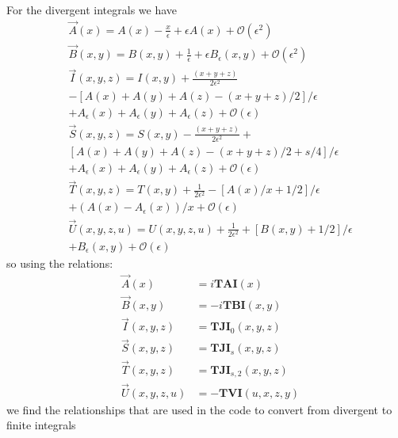 For the divergent integrals we have \cite{Martin2006}
\begin{align*}
&\vec{A}(x) = A(x) -\frac{x}{\epsilon} +\epsilon A(x) +\mathcal{O}(\epsilon^2) \\
&\vec{B}(x,y)= B(x,y) +\frac{1}{\epsilon} +\epsilon B_{\epsilon}(x,y) +\mathcal{O}(\epsilon^2) \\
&\vec{I}(x,y,z)= I(x,y) +\frac{(x+y+z)}{2\epsilon^2}  \\ &- \left[A(x)+A(y)+A(z)-(x+y+z)/2\right]/\epsilon\\ &+ A_{\epsilon}(x)+ A_{\epsilon}(y)+ A_{\epsilon}(z)+\mathcal{O}(\epsilon) \\
&\vec{S}(x,y,z)= S(x,y) -\frac{(x+y+z)}{2\epsilon^2} + \\ & \left[A(x)+A(y)+A(z)-(x+y+z)/2+s/4\right]/\epsilon\\ &+ A_{\epsilon}(x)+ A_{\epsilon}(y)+ A_{\epsilon}(z)+\mathcal{O}(\epsilon) \\
&\vec{T}(x,y,z)= T(x,y) +\frac{1}{2\epsilon^2} -\left[A(x)/x +1/2\right]/\epsilon\\ &+ (A(x)- A_{\epsilon}(x))/x+\mathcal{O}(\epsilon) \\
&\vec{U}(x,y,z,u)= U(x,y,z,u) +\frac{1}{2\epsilon^2} +\left[B(x,y) +1/2\right]/\epsilon\\ &+ B_{\epsilon}(x,y)+\mathcal{O}(\epsilon)
\end{align*}
so using the relations:
\begin{eqnarray*}
&\vec{A}(x) &=i \mathtt{\mathbf{TAI}}(x)\\
&\vec{B}(x,y) &=-i \mathtt{\mathbf{TBI}}(x,y)\\
&\vec{I}(x,y,z)&=\mathtt{\mathbf{TJI}}_0(x,y,z)\\
&\vec{S}(x,y,z)&=\mathtt{\mathbf{TJI}}_s(x,y,z)\\
&\vec{T}(x,y,z)&=\mathtt{\mathbf{TJI}}_{s,2}(x,y,z)\\
&\vec{U}(x,y,z,u)&=-\mathtt{\mathbf{TVI}}(u,x,z,y)
\end{eqnarray*}
we find the relationships that are used in the code to convert from divergent to finite integrals
